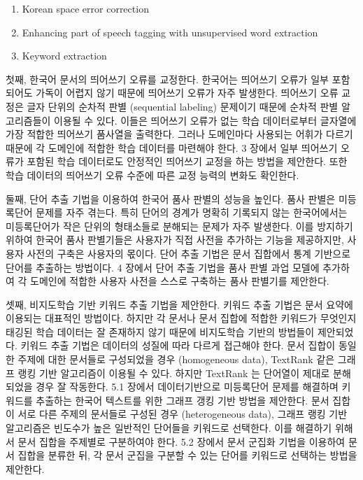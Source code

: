 \documentclass[11pt]{article}
\begin{document}
\begin{enumerate}
    \item Korean space error correction
    \item Enhancing part of speech tagging with unsupervised word extraction
    \item Keyword extraction
\end{enumerate}

첫째, 한국어 문서의 띄어쓰기 오류를 교정한다.
한국어는 띄어쓰기 오류가 일부 포함되어도 가독이 어렵지 않기 때문에 띄어쓰기 오류가 자주 발생한다.
띄어쓰기 오류 교정은 글자 단위의 순차적 판별 (sequential labeling) 문제이기 때문에 순차적 판별 알고리즘들이 이용될 수 있다.
이들은 띄어쓰기 오류가 없는 학습 데이터로부터 글자열에 가장 적합한 띄어쓰기 품사열을 출력한다.
그러나 도메인마다 사용되는 어휘가 다르기 때문에 각 도메인에 적합한 학습 데이터를 마련해야 한다.
3 장에서 일부 띄어쓰기 오류가 포함된 학습 데이터로도 안정적인 띄어쓰기 교정을 하는 방법을 제안한다.
또한 학습 데이터의 띄어쓰기 오류 수준에 따른 교정 능력의 변화도 확인한다.

둘째, 단어 추출 기법을 이용하여 한국어 품사 판별의 성능을 높인다.
품사 판별은 미등록단어 문제를 자주 겪는다.
특히 단어의 경계가 명확히 기록되지 않는 한국어에서는 미등록단어가 작은 단위의 형태소들로 분해되는 문제가 자주 발생한다.
이를 방지하기 위하여 한국어 품사 판별기들은 사용자가 직접 사전을 추가하는 기능을 제공하지만, 사용자 사전의 구축은 사용자의 몫이다.
단어 추출 기법은 문서 집합에서 통계 기반으로 단어를 추출하는 방법이다.
4 장에서 단어 추출 기법을 품사 판별 과업 모델에 추가하여 각 도메인에 적합한 사용자 사전을 스스로 구축하는 품사 판별기를 제안한다.

셋째, 비지도학습 기반 키워드 추출 기법을 제안한다.
키워드 추출 기법은 문서 요약에 이용되는 대표적인 방법이다.
하지만 각 문서나 문서 집합에 적합한 키워드가 무엇인지 태깅된 학습 데이터는 잘 존재하지 않기 때문에 비지도학습 기반의 방법들이 제안되었다.
키워드 추출 기법은 데이터의 성질에 따라 다르게 접근해야 한다.
문서 집합이 동일한 주제에 대한 문서들로 구성되었을 경우 (homogeneous data), TextRank \citep{mihalcea2004textrank} 같은 그래프 랭킹 기반 알고리즘이 이용될 수 있다.
하지만 TextRank 는 단어열이 제대로 분해되었을 경우 잘 작동한다.
5.1 장에서 데이터기반으로 미등록단어 문제를 해결하며 키워드를 추출하는 한국어 텍스트를 위한 그래프 갱킹 기반 방법을 제안한다.
문서 집합이 서로 다른 주제의 문서들로 구성된 경우 (heterogeneous data), 그래프 랭킹 기반 알고리즘은 빈도수가 높은 일반적인 단어들을 키워드로 선택한다.
이를 해결하기 위해서 문서 집합을 주제별로 구분하여야 한다.
5.2 장에서 문서 군집화 기법을 이용하여 문서 집합을 분류한 뒤, 각 문서 군집을 구분할 수 있는 단어를 키워드로 선택하는 방법을 제안한다.
\end{document}

